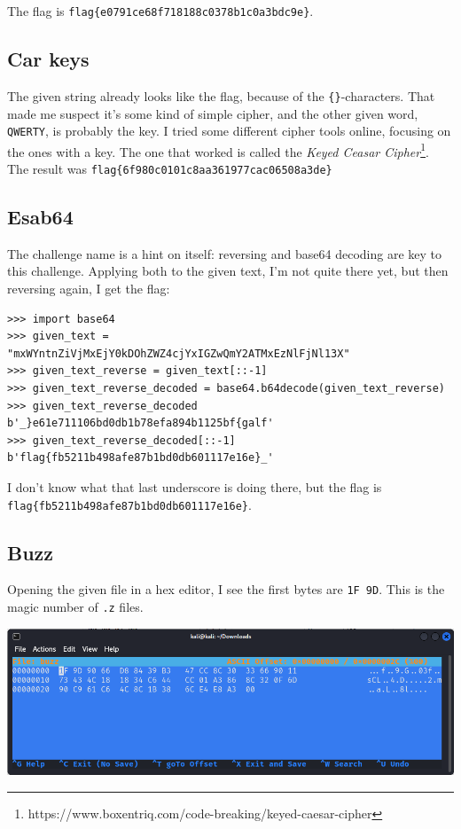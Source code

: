 \documentclass{article}
\begin{document}
\noindent
The flag is \texttt{flag\{e0791ce68f718188c0378b1c0a3bdc9e\}}.
\subsection{Car keys}

The given string already looks like the flag, because of the \texttt{\{\}}-characters. That made me suspect it's some kind of simple cipher, and the other given word, \texttt{QWERTY}, is probably the key. I tried some different cipher tools online, focusing on the ones with a key. The one that worked is called the \textit{Keyed Ceasar Cipher}\footnote{https://www.boxentriq.com/code-breaking/keyed-caesar-cipher}. The result was \texttt{flag\{6f980c0101c8aa361977cac06508a3de\}}

\subsection{Esab64}

The challenge name is a hint on itself: reversing and base64 decoding are key to this challenge. Applying both to the given text, I'm not quite there yet, but then reversing again, I get the flag:

\begin{lstlisting} 
>>> import base64
>>> given_text = "mxWYntnZiVjMxEjY0kDOhZWZ4cjYxIGZwQmY2ATMxEzNlFjNl13X"
>>> given_text_reverse = given_text[::-1]
>>> given_text_reverse_decoded = base64.b64decode(given_text_reverse)
>>> given_text_reverse_decoded
b'_}e61e711106bd0db1b78efa894b1125bf{galf'
>>> given_text_reverse_decoded[::-1]
b'flag{fb5211b498afe87b1bd0db601117e16e}_'
\end{lstlisting}

\noindent
I don't know what that last underscore is doing there, but the flag is \texttt{flag\{fb5211b498afe87b1bd0db601117e16e\}}.

\subsection{Buzz}

Opening the given file in a hex editor, I see the first bytes are \texttt{1F 9D}. This is the magic number of \texttt{.z} files.

\begin{center}
    \includegraphics[width=16cm]{buzz/screenshot.png}
\end{center}
\end{document}
